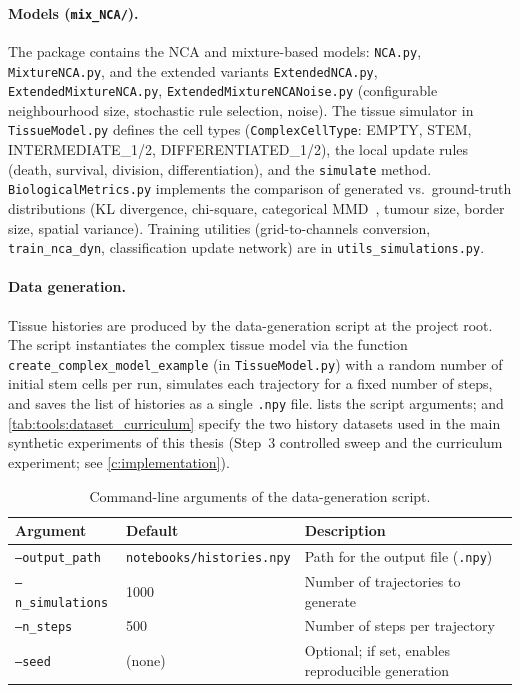 \paragraph{Models (\texttt{mix\_NCA/}).}
The package contains the NCA and mixture-based models: \texttt{NCA.py}, \texttt{MixtureNCA.py}, and the extended variants \texttt{ExtendedNCA.py}, \texttt{ExtendedMixtureNCA.py}, \texttt{ExtendedMixtureNCANoise.py} (configurable neighbourhood size, stochastic rule selection, noise).
The tissue simulator in \texttt{TissueModel.py} defines the cell types (\texttt{ComplexCellType}: EMPTY, STEM, INTERMEDIATE\_1/2, DIFFERENTIATED\_1/2), the local update rules (death, survival, division, differentiation), and the \texttt{simulate} method.
\texttt{BiologicalMetrics.py} implements the comparison of generated vs.\ ground-truth distributions (KL divergence, chi-square, categorical MMD~\cite{gretton2012mmd}, tumour size, border size, spatial variance).
Training utilities (grid-to-channels conversion, \texttt{train\_nca\_dyn}, classification update network) are in \texttt{utils\_simulations.py}.

\paragraph{Data generation.}
Tissue histories are produced by the data-generation script at the project root.
The script instantiates the complex tissue model via the function \verb|create_complex_model_example| (in \texttt{TissueModel.py}) with a random number of initial stem cells per run, simulates each trajectory for a fixed number of steps, and saves the list of histories as a single \texttt{.npy} file.
 lists the script arguments;  and \cref{tab:tools:dataset_curriculum} specify the two history datasets used in the main synthetic experiments of this thesis (Step~3 controlled sweep and the curriculum experiment; see \cref{c:implementation}).

\begin{table}[htbp]
  \centering
  \caption{Command-line arguments of the data-generation script.}
  \label{tab:tools:genhist}
  \begin{tabular}{@{}llp{5.5cm}@{}}
      \hline
      \textbf{Argument} & \textbf{Default} & \textbf{Description} \\
      \hline
      \texttt{--output\_path} & \texttt{notebooks/histories.npy} & Path for the output file (\texttt{.npy}) \\
      \texttt{--n\_simulations} & 1000 & Number of trajectories to generate \\
      \texttt{--n\_steps} & 500 & Number of steps per trajectory \\
      \texttt{--seed} & (none) & Optional; if set, enables reproducible generation \\
      \hline
  \end{tabular}
\end{table}

